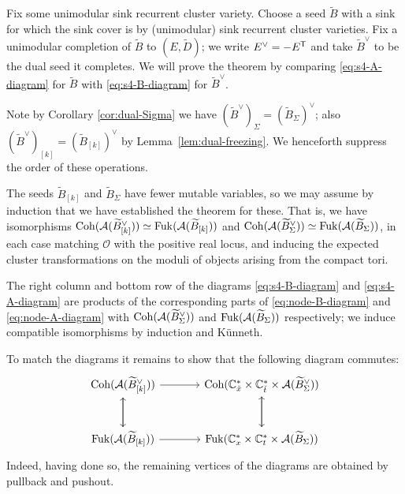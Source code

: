 \documentclass[12pt, letter]{amsart}
\DeclareMathOperator{\Fuk}{Fuk}
\theoremstyle{definition}
\begin{document}
Fix some unimodular sink recurrent cluster variety.  Choose a seed $\widetilde{B}$ with a sink for which the sink cover is by (unimodular) sink recurrent cluster varieties.  Fix a unimodular completion  of $\widetilde{B}$ to $(E,\widetilde D)$; we write  $E^\vee =-E^{\mathsf T}$ and take $\widetilde{B}^\vee$ to be the dual seed it completes.  
We will prove the theorem by comparing \eqref{eq:s4-A-diagram} for $\widetilde{B}$ with \eqref{eq:s4-B-diagram} for $\widetilde{B}^\vee$. 

Note by Corollary \ref{cor:dual-Sigma} we have $(\widetilde B^\vee)_\Sigma = (\widetilde B_\Sigma)^\vee$; also 
$(\widetilde B^\vee)_{[k]} = (\widetilde B_{[k]})^\vee$ by Lemma~\ref{lem:dual-freezing}.  We henceforth suppress the order of these operations. 

The seeds $\widetilde{B}_{[k]}$ and $\widetilde{B}_\Sigma$ have fewer mutable variables, so we may assume by induction that we have established the theorem for these. 
That is, we have isomorphisms $\Coh(\cA(\widetilde B^\vee_{[k]})) \simeq \Fuk(\cA(\widetilde B_{[k]}))$ and $\Coh(\cA(\widetilde B^\vee_{\Sigma}))  \simeq  \Fuk(\cA(\widetilde B_{\Sigma}))$, in each case matching $\mathcal{O}$ with the positive real locus, and inducing the expected cluster transformations on the moduli of objects arising from the compact tori. 




The right column and bottom row of the diagrams \eqref{eq:s4-B-diagram} and \eqref{eq:s4-A-diagram}   are products of the corresponding parts of \eqref{eq:node-B-diagram} and \eqref{eq:node-A-diagram} with 
$\operatorname{Coh}(\mathcal{A}(\widetilde B^\vee_{\Sigma}))$ and $\Fuk(\cA(\widetilde B_{\Sigma}))$
respectively; we induce compatible isomorphisms by induction and  K\"unneth. 

To match the diagrams it remains to show that the following diagram commutes: 
\begin{equation}\label{eq:compatibility check}
\begin{tikzcd}[column sep=large,row sep=large]
\Coh(\cA( \widetilde B_{[k]}^\vee)) \arrow[r] \arrow[d]
&\Coh( \bC_{\c x}^* \times  \bC^*_{\c t} \times \cA(\widetilde B_\Sigma^\vee ) ) \arrow[d]\\
\Fuk(\cA( \widetilde B_{[k]})) \arrow[r] \arrow[u]
&\Fuk( \bC_x^* \times  \bC^*_t \times \cA(\widetilde B_\Sigma ) ) \arrow[u]
\end{tikzcd}
\end{equation}
Indeed, having done so, the remaining vertices of the diagrams are obtained by pullback and pushout. 
\end{document}
